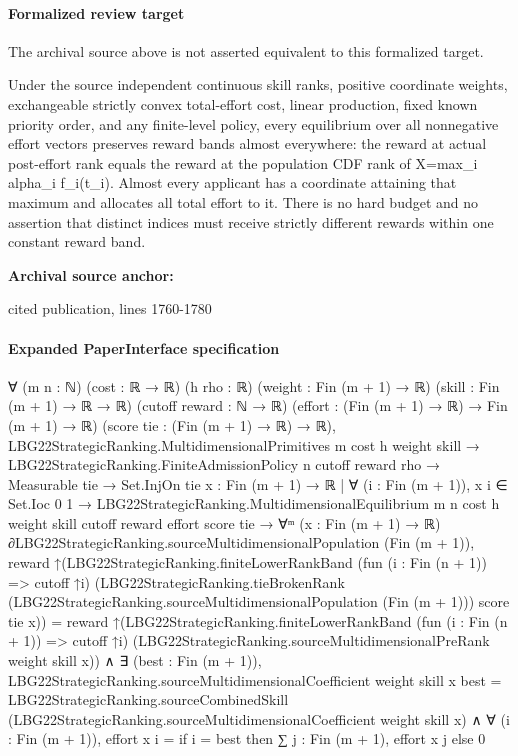 \documentclass[10pt]{article}
\begin{document}
\paragraph{Formalized review target}
The archival source above is not asserted equivalent to this formalized target.
\begin{ReviewVerbatim}
Under the source independent continuous skill ranks, positive coordinate weights, exchangeable strictly convex total-effort cost, linear production, fixed known priority order, and any finite-level policy, every equilibrium over all nonnegative effort vectors preserves reward bands almost everywhere: the reward at actual post-effort rank equals the reward at the population CDF rank of X=max_i alpha_i f_i(t_i). Almost every applicant has a coordinate attaining that maximum and allocates all total effort to it. There is no hard budget and no assertion that distinct indices must receive strictly different rewards within one constant reward band.
\end{ReviewVerbatim}

\textbf{Archival source anchor:} {\footnotesize\raggedright cited publication, lines 1760-\allowbreak{}1780\par}
\paragraph{Expanded PaperInterface specification}
\begin{ReviewVerbatim}
∀ (m n : ℕ) (cost : ℝ → ℝ) (h rho : ℝ) (weight : Fin (m + 1) → ℝ) (skill : Fin (m + 1) → ℝ → ℝ) (cutoff reward : ℕ → ℝ)
  (effort : (Fin (m + 1) → ℝ) → Fin (m + 1) → ℝ) (score tie : (Fin (m + 1) → ℝ) → ℝ),
  LBG22StrategicRanking.MultidimensionalPrimitives m cost h weight skill →
    LBG22StrategicRanking.FiniteAdmissionPolicy n cutoff reward rho →
      Measurable tie →
        Set.InjOn tie {x : Fin (m + 1) → ℝ | ∀ (i : Fin (m + 1)), x i ∈ Set.Ioc 0 1} →
          LBG22StrategicRanking.MultidimensionalEquilibrium m n cost h weight skill cutoff reward effort score tie →
            ∀ᵐ (x : Fin (m + 1) → ℝ) ∂LBG22StrategicRanking.sourceMultidimensionalPopulation (Fin (m + 1)),
              reward
                    ↑(LBG22StrategicRanking.finiteLowerRankBand (fun (i : Fin (n + 1)) => cutoff ↑i)
                        (LBG22StrategicRanking.tieBrokenRank
                          (LBG22StrategicRanking.sourceMultidimensionalPopulation (Fin (m + 1))) score tie x)) =
                  reward
                    ↑(LBG22StrategicRanking.finiteLowerRankBand (fun (i : Fin (n + 1)) => cutoff ↑i)
                        (LBG22StrategicRanking.sourceMultidimensionalPreRank weight skill x)) ∧
                ∃ (best : Fin (m + 1)),
                  LBG22StrategicRanking.sourceMultidimensionalCoefficient weight skill x best =
                      LBG22StrategicRanking.sourceCombinedSkill
                        (LBG22StrategicRanking.sourceMultidimensionalCoefficient weight skill x) ∧
                    ∀ (i : Fin (m + 1)), effort x i = if i = best then ∑ j : Fin (m + 1), effort x j else 0
\end{ReviewVerbatim}
\end{document}
